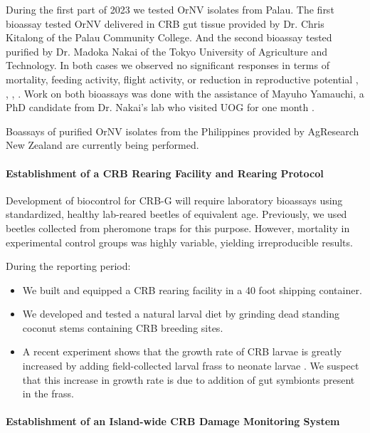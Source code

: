 \begin{refsection}
During the first part of 2023 we tested OrNV isolates from Palau. The first bioassay tested OrNV delivered in CRB gut tissue provided by Dr. Chris Kitalong of the Palau Community College. And the second bioassay tested purified by Dr. Madoka Nakai of the Tokyo University of Agriculture and Technology. In both cases we observed no significant responses in terms of mortality, feeding activity, flight activity, or reduction in reproductive potential \cite{mooreTestingPalauGut2022}, \cite{moorePalaugutsexperiment2022}, \cite{mooreFlightTest2023}, \cite{mooreGitHubRepositoryCrbflighttest2023}. Work on both bioassays was done with the assistance of Mayuho Yamauchi, a PhD candidate from Dr. Nakai's lab who visited UOG for one month \cite{hansonUOGTokyoUniversity2023}.

Boassays of purified OrNV isolates from the Philippines provided by AgResearch New Zealand are currently being performed.

\paragraph{Establishment of a CRB Rearing Facility and Rearing Protocol}

Development of biocontrol for CRB-G will require laboratory bioassays using standardized, healthy lab-reared beetles of equivalent age. Previously, we used beetles collected from pheromone traps for this purpose. However, mortality in experimental control groups was highly variable, yielding irreproducible results. 

During the reporting period:
\begin{itemize}
	\item We built and equipped a CRB rearing facility in a 40 foot shipping container.  
	\item We developed and tested a natural larval diet by grinding dead standing coconut stems containing CRB breeding sites.
	\item A recent experiment shows that the growth rate of CRB larvae is greatly increased by adding field-collected larval frass to neonate larvae \cite{mooreGitHubRepositoryAubreymoore2023}. We suspect that this increase in growth rate is due to addition of gut symbionts present in the frass.	
\end{itemize}

\paragraph{Establishment of an Island-wide CRB Damage Monitoring System}


\end{refsection}
